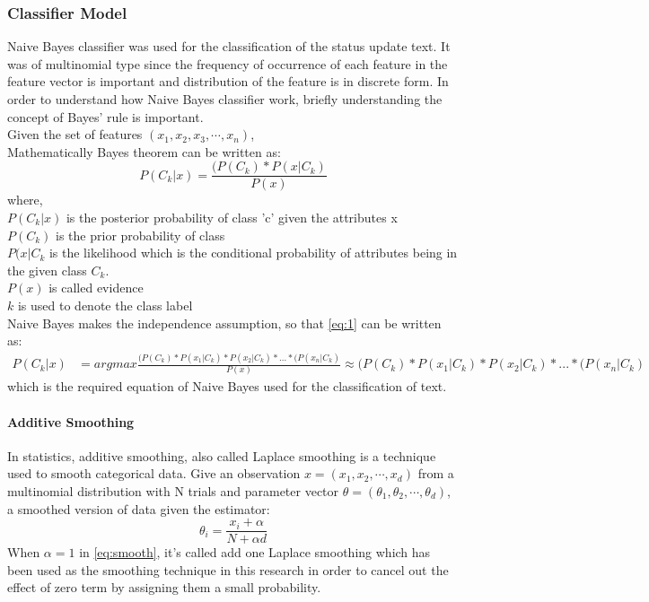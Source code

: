 \documentclass[conference]{IEEEtran}
\begin{document}
\subsubsection{Classifier Model}
Naive Bayes classifier was used for the classification of the status update text. It was of multinomial type since the frequency of occurrence of each feature in the feature vector is important and distribution of the feature is in discrete form.
In order to understand how Naive Bayes classifier work, briefly understanding the concept of Bayes' rule is important.\\
Given the set of features $(x_1,x_2,x_3,\cdots, x_n)$, \\
Mathematically Bayes theorem can be written as:\\
\begin{equation}\label{eq:1}
P(C_{k}|x) = \frac{(P(C_{k}) * P(x|C_{k})} { P(x)}
\end{equation}
where,\\
$P(C_{k} |x)$ is the posterior probability of class 'c' given the attributes x \\
$P(C_{k})$ is the prior probability of class \\
$P(x|C_{k}$ is the likelihood which is the conditional probability of attributes being in the given class $C_k$.\\
$P(x)$ is called evidence \\
$k$ is used to denote the class label \\
Naive Bayes makes the independence assumption, so that \ref{eq:1} can be written as:\\
\begin{equation}\label{eq:naive}
\begin{aligned}

P(C_{k}|x) 
 & = argmax \frac{(P(C_{k}) * P(x_1|C_{k}) * P(x_2|C_{k})*...* (P(x_n|C_{k})} { P(x)}
 \approx  (P(C_{k}) * P(x_1|C_{k}) * P(x_2|C_{k})*...* (P(x_n|C_{k})

\end{aligned}

\end{equation}
which is the required equation of Naive Bayes used for the classification of text.

\paragraph{Additive Smoothing}

In statistics, additive smoothing, also called Laplace smoothing is a technique used to smooth categorical data. Give an observation $x = (x_1,x_2,\cdots,x_d)$ from a multinomial distribution with N trials and parameter vector $\theta = (\theta_1,\theta_2,\cdots,\theta_d)$, a smoothed version of data given the estimator:\\
\begin{equation}\label{eq:smooth}
  \theta_i = \frac{x_i + \alpha}{N+ \alpha d}
\end{equation}
When $\alpha = 1 $ in \ref{eq:smooth}, it's called add one Laplace smoothing which has been used as the smoothing technique in this research in order to cancel out the effect of zero term by assigning them a small probability.
\end{document}
